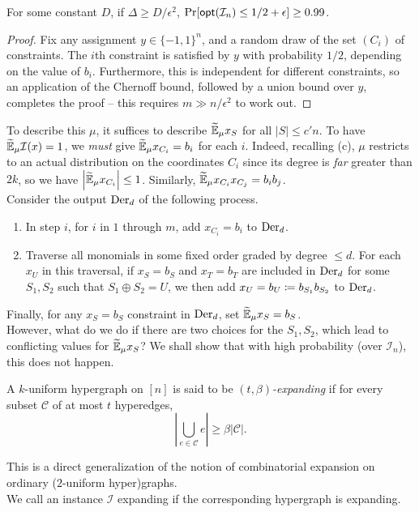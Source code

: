 	\begin{fprop}
		\label{prop:grig-small-true-opt}
		For some constant $D$, if $\Delta \ge D/\epsilon^2$, $\Pr[\mathsf{opt}(\mathcal{I}_n) \le 1/2 + \epsilon] \ge 0.99$.
	\end{fprop}
	\begin{proof}
		Fix any assignment $y \in \{-1,1\}^n$, and a random draw of the set $(C_i)$ of constraints. The $i$th constraint is satisfied by $y$ with probability $1/2$, depending on the value of $b_i$. Furthermore, this is independent for different constraints, so an application of the Chernoff bound, followed by a union bound over $y$, completes the proof -- this requires $m \gg n/\epsilon^2$ to work out.
	\end{proof}
	To describe this $\mu$, it suffices to describe $\widetilde{\mathbb{E}}_\mu x_S$ for all $|S| \le c'n$. To have $\widetilde{\mathbb{E}}_\mu \mathcal{I}(x) = 1$, we \emph{must} give $\widetilde{\mathbb{E}}_\mu x_{C_i} = b_i$ for each $i$. Indeed, recalling (c), $\mu$ restricts to an actual distribution on the coordinates $C_i$ since its degree is \emph{far} greater than $2k$, so we have $\left|\widetilde{\mathbb{E}}_\mu x_{C_i}\right| \le 1$. Similarly, $\widetilde{\mathbb{E}}_\mu x_{C_i} x_{C_j} = b_i b_j$.\\
	Consider the output $\operatorname{Der}_d$ of the following process.
	\begin{enumerate}
		\item In step $i$, for $i$ in $1$ through $m$, add $x_{C_i} = b_i$ to $\operatorname{Der}_d$.
		\item Traverse all monomials in some fixed order graded by degree $\le d$. For each $x_U$ in this traversal, if  $x_S = b_S$ and $x_T = b_T$ are included in $\operatorname{Der}_d$ for some $S_1,S_2$ such that $S_1 \oplus S_2 = U$, we then add $x_U = b_U \coloneqq b_{S_1} b_{S_2}$ to $\operatorname{Der}_d$.
	\end{enumerate}
	Finally, for any $x_S = b_S$ constraint in $\operatorname{Der}_d$, set $\widetilde{\mathbb{E}}_\mu x_S = b_S$.\\
	However, what do we do if there are two choices for the $S_1,S_2$, which lead to conflicting values for $\widetilde{\mathbb{E}}_\mu x_S$? We shall show that with high probability (over $\mathcal{I}_n$), this does not happen.

	\begin{fdef}
		A $k$-uniform hypergraph on $[n]$ is said to be \emph{$(t,\beta)$-expanding} if for every subset $\mathcal{C}$ of at most $t$ hyperedges, 
		\[ \left| \bigcup_{e \in \mathcal{C}} e \right| \ge \beta |\mathcal{C}|. \]
	\end{fdef}
	This is a direct generalization of the notion of combinatorial expansion on ordinary ($2$-uniform hyper)graphs.\\
	We call an instance $\mathcal{I}$ expanding if the corresponding hypergraph is expanding.

